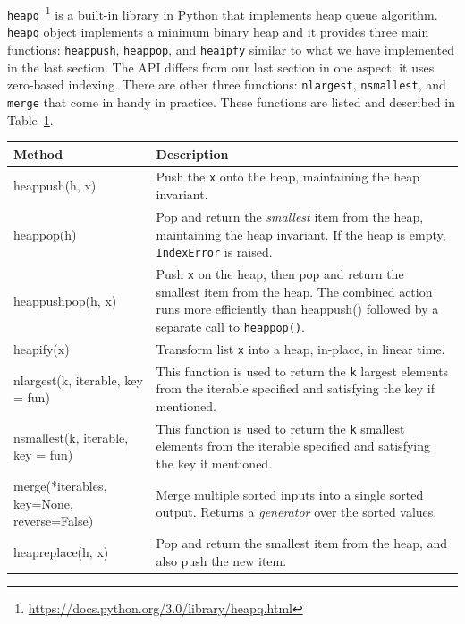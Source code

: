 \documentclass[../main.tex]{subfiles}
\begin{document}
\texttt{heapq}~\footnote{\url{https://docs.python.org/3.0/library/heapq.html}} is a built-in library in Python that implements heap queue algorithm. \texttt{heapq} object implements a minimum binary heap  and it provides three main functions: \texttt{heappush}, \texttt{heappop}, and \texttt{heaipfy} similar to what we have implemented in the last section. The API differs from our last section in one aspect: it uses zero-based indexing. There are other three functions: \texttt{nlargest}, \texttt{nsmallest}, and \texttt{merge} that come in handy in practice. These functions are listed and described in Table~\ref{tab:functions_in_heapq}.%
\begin{table}[h]
\begin{small}
\centering
\noindent{}
 \noindent \begin{tabular}{|p{}|p{}| }
  \hline
Method & Description   \\ \hline
{heappush(h, x)}  &  Push the \texttt{x} onto the heap, maintaining the heap invariant.  \\\hline
{heappop(h)}  &Pop and return the \textit{smallest} item from the heap, maintaining the heap invariant. If the heap is empty, \texttt{IndexError} is raised.\\ \hline
{heappushpop(h, x)}  &Push \texttt{x} on the heap, then pop and return the smallest item from the heap. The combined action runs more efficiently than {heappush()} followed by a separate call to \texttt{heappop()}.\\ \hline
{heapify(x)} & Transform list \texttt{x} into a heap, in-place, in linear time.\\ \hline
{nlargest(k, iterable, key = fun)} & This function is used to return the \texttt{k} largest elements from the iterable specified and satisfying the key if mentioned. \\ \hline
{nsmallest(k, iterable, key = fun)} & This function is used to return the \texttt{k} smallest elements from the iterable specified and satisfying the key if mentioned. \\ \hline

{merge(*iterables, key=None, reverse=False)} & Merge multiple sorted inputs into a single sorted output. Returns a \textit{generator} over the sorted values. \\ \hline
{heapreplace(h, x)} & Pop and return the smallest item from the heap, and also push the new item.\\ \hline
\end{tabular}
  \label{tab:functions_in_heapq}
  \end{small}
\end{table} 
\end{document}
